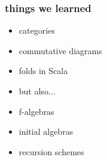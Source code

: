 \documentclass[include/preamble.tex]{subfiles}
\begin{document}
\begin{frame}
  \frametitle{things we learned}
  \begin{itemize}
    \pause
  \item categories
  \item commutative diagrams
  \item folds in Scala
    \newline
    \pause
  \item[] but also...
    \newline
    \pause
  \item f-algebras
    \pause
  \item initial algebras
    \pause
  \item recursion schemes
  \end{itemize}
\end{frame}
\end{document}
